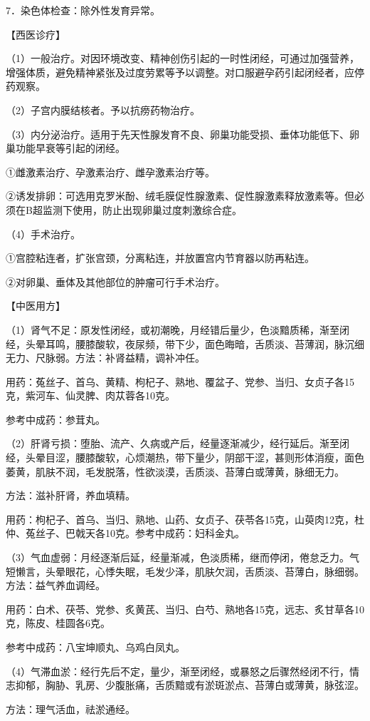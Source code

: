\documentclass[12pt,UTF8]{ctexbook}
\begin{document}
7．染色体检查：除外性发育异常。

【西医诊疗】

（1）一般治疗。对因环境改变、精神创伤引起的一时性闭经，可通过加强营养，增强体质，避免精神紧张及过度劳累等予以调整。对口服避孕药引起闭经者，应停药观察。

（2）子宫内膜结核者。予以抗痨药物治疗。

（3）内分泌治疗。适用于先天性腺发育不良、卵巢功能受损、垂体功能低下、卵巢功能早衰等引起的闭经。

①雌激素治疗、孕激素治疗、雌孕激素治疗等。

②诱发排卵：可选用克罗米酚、绒毛膜促性腺激素、促性腺激素释放激素等。但必须在B超监测下使用，防止出现卵巢过度刺激综合症。

（4）手术治疗。

①宫腔粘连者，扩张宫颈，分离粘连，并放置宫内节育器以防再粘连。

②对卵巢、垂体及其他部位的肿瘤可行手术治疗。

【中医用方】

（1）肾气不足：原发性闭经，或初潮晚，月经错后量少，色淡黯质稀，渐至闭经，头晕耳鸣，腰膝酸软，夜尿频，带下少，面色晦暗，舌质淡、苔薄润，脉沉细无力、尺脉弱。方法：补肾益精，调补冲任。

用药：菟丝子、首乌、黄精、枸杞子、熟地、覆盆子、党参、当归、女贞子各15克，紫河车、仙灵脾、肉苁蓉各10克。

参考中成药：参茸丸。

（2）肝肾亏损：堕胎、流产、久病或产后，经量逐渐减少，经行延后。渐至闭经，头晕目涩，腰膝酸软，心烦潮热，带下量少，阴部干涩，甚则形体消瘦，面色萎黄，肌肤不润，毛发脱落，性欲淡漠，舌质淡、苔薄白或薄黄，脉细无力。

方法：滋补肝肾，养血填精。

用药：枸杞子、首乌、当归、熟地、山药、女贞子、茯苓各15克，山萸肉12克，杜仲、菟丝子、巴戟天各10克。参考中成药：妇科金丸。

（3）气血虚弱：月经逐渐后延，经量渐减，色淡质稀，继而停闭，倦怠乏力。气短懒言，头晕眼花，心悸失眠，毛发少泽，肌肤欠润，舌质淡、苔薄白，脉细弱。方法：益气养血调经。

用药：白术、茯苓、党参、炙黄芪、当归、白芍、熟地各15克，远志、炙甘草各10克，陈皮、桂圆各6克。

参考中成药：八宝坤顺丸、乌鸡白凤丸。

（4）气滞血淤：经行先后不定，量少，渐至闭经，或暴怒之后骤然经闭不行，情志抑郁，胸胁、乳房、少腹胀痛，舌质黯或有淤斑淤点、苔薄白或薄黄，脉弦涩。

方法：理气活血，祛淤通经。
\end{document}
